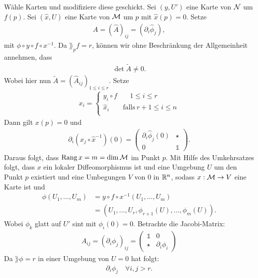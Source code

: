 \begin{bew}
Wähle Karten und modifiziere diese geschickt.
Sei $(y, U')$ eine Karte von $\mathcal{N}$ um $f(p)$.
Sei $(\hat{x}, U)$ eine Karte von $\mathcal{M}$ um $p$ mit $\hat{x}(p) = 0$.
Setze 
\begin{align}
\hat{A} = (\hat{A})_{i j} = (\partial_i \hat{\phi}_j),
\end{align}
mit $\phi \circ y \circ f \circ x^{-1}$.
Da $\rang_p f = r$, können wir ohne Beschränkung der Allgemeinheit annehmen, dass
\begin{align}
\det \tilde{A} \neq 0.
\end{align}
Wobei hier nun $\tilde{A} = (\hat{A}_{i j})_{1 \leq i \leq r}$.
Setze 
\begin{align}
x_i = \left\{
\begin{array}{ll}
y_i \circ f & \quad 1 \leq i \leq r \\
\hat{x}_i & \textrm{falls} \ r+1 \leq i \leq n \\
\end{array}
\right. 
\end{align}
Dann gilt $x(p)=0$ und 
\begin{align}
\partial_i (x_j \circ \hat{x}^{-1})(0) = 
\left(\begin{matrix}
\partial_i \hat{\phi}_j (0) & \star \\ 
0 & \mathds{1}
\end{matrix} \right) .
\end{align}
Daraus folgt, dass $\operatorname{Rang} x = m = \dim \mathcal{M}$ im Punkt $p$.
Mit Hilfe des Umkehrsatzes folgt, dass $x$ ein lokaler Diffeomorphismus ist 
und eine Umgebung $U$ um den Punkt $p$ existiert und eine Umbegungen $V$ von $0$ in $\mathbb{R}^n$, 
sodass $x: \mathcal{M} \to V$ eine Karte ist und
\begin{align}
\phi (U_1, \dots, U_m) &= y \circ f \circ x^{-1}(U_1, \dots, U_m) \\
&= (U_1, \dots, U_r, \phi_{r+1}(U), \dots, \phi_m (U)).
\end{align}
Wobei $\phi_k$ glatt auf $U'$ sint mit $\phi_i(0)=0$. 
Betrachte die Jacobi-Matrix:
\begin{align}
A_{i j} = (\partial _i \phi_j )_{i j} = \begin{pmatrix}
\mathds{1} & 0 \\ 
\star & \partial_i \phi_i
\end{pmatrix} 
\end{align}
Da $\rang \phi = r$ in einer Umgebung von $U=0$ hat folgt:
\begin{align}
\partial_i \phi_j \quad \forall i, j > r.
\end{align}
\end{bew}

